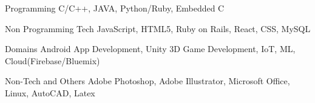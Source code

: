 

\begin{cvskills}

  \cvskill
    {Programming} %
    {C/C++, JAVA, Python/Ruby, Embedded C} %

  \cvskill
    {Non Programming Tech} %
    {JavaScript, HTML5, Ruby on Rails, React, CSS, MySQL} %

  \cvskill
    {Domains} %
    {Android App Development, Unity 3D Game Development, IoT, ML, Cloud(Firebase/Bluemix)} %

  \cvskill
    {Non-Tech and Others} %
    {Adobe Photoshop, Adobe Illustrator, Microsoft Office, Linux, AutoCAD, Latex} %

\end{cvskills}
